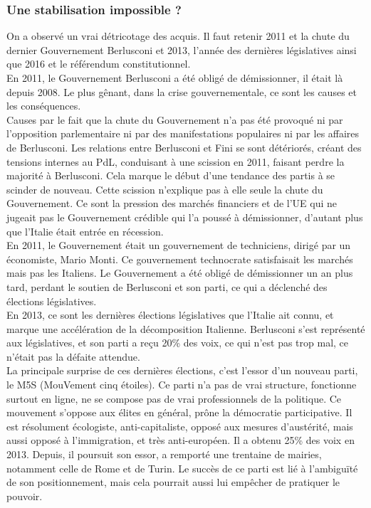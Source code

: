 \documentclass[10pt, a4paper, openany]{book}
\begin{document}
\subsubsection{Une stabilisation impossible ?}

On a observé un vrai détricotage des acquis. Il faut retenir 2011 et la chute du dernier Gouvernement Berlusconi et 2013, l'année des dernières législatives ainsi que 2016 et le référendum constitutionnel. \\
En 2011, le Gouvernement Berlusconi a été obligé de démissionner, il était là depuis 2008. Le plus gênant, dans la crise gouvernementale, ce sont les causes et les conséquences. \\
Causes par le fait que la chute du Gouvernement n'a pas été provoqué ni par l'opposition parlementaire ni par des manifestations populaires ni par les affaires de Berlusconi. Les relations  entre Berlusconi et Fini se sont détériorés, créant des tensions internes au PdL, conduisant à une scission en 2011, faisant perdre la majorité à Berlusconi. Cela marque le début d'une tendance des partis à se scinder de nouveau. Cette scission n'explique pas à elle seule la chute du Gouvernement. Ce sont la pression des marchés financiers et de l'UE qui ne jugeait pas le Gouvernement crédible qui l'a poussé à démissionner, d'autant plus que l'Italie était entrée en récession. \\
En 2011, le Gouvernement était un gouvernement de techniciens, dirigé par un économiste, Mario Monti. Ce gouvernement technocrate satisfaisait les marchés mais pas les Italiens. Le Gouvernement a été obligé de démissionner un an plus tard, perdant le soutien de Berlusconi et son parti, ce qui a déclenché des élections législatives. \\
En 2013, ce sont les dernières élections législatives que l'Italie ait connu, et marque une accélération de la décomposition Italienne. Berlusconi s'est représenté aux législatives, et son parti a reçu 20\% des voix, ce qui n'est pas trop mal, ce n'était pas la défaite attendue. \\
La principale surprise de ces dernières élections, c'est l'essor d'un nouveau parti, le M5S (MouVement cinq étoiles). Ce parti n'a pas de vrai structure, fonctionne surtout en ligne, ne se compose pas de vrai professionnels de la politique. Ce mouvement s'oppose aux élites en général, prône la démocratie participative. Il est résolument écologiste, anti-capitaliste, opposé aux mesures d'austérité, mais aussi opposé à l'immigration, et très anti-européen. Il a obtenu 25\% des voix en 2013. Depuis, il poursuit son essor, a remporté une trentaine de mairies, notamment celle de Rome et de Turin. Le succès de ce parti est lié à l'ambiguïté de son positionnement, mais cela pourrait aussi lui empêcher de pratiquer le pouvoir. \\
\end{document}
